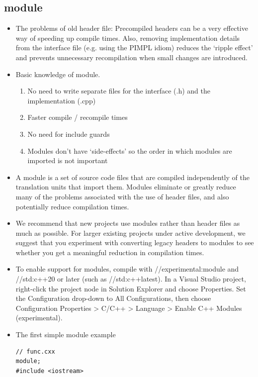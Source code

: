 \documentclass[a4paper,11pt,twoside]{book}
\begin{document}
\subsection{module}
\begin{itemize}
	
	\item The problems of old header file: Precompiled headers can be a very effective way of speeding up compile times. Also, removing implementation details from the interface file (e.g. using the PIMPL idiom) reduces the ‘ripple effect’ and prevents unnecessary recompilation when small changes are introduced.
	
	\item Basic knowledge of module.
	\begin{enumerate}
		\item No need to write separate files for the interface (.h) and the implementation (.cpp)
		\item Faster compile / recompile times
		\item No need for include guards	
		\item Modules don’t have ‘side-effects’ so the order in which modules are imported is not important
	\end{enumerate}

	
	\item A module is a set of source code files that are compiled independently of the translation units that import them. Modules eliminate or greatly reduce many of the problems associated with the use of header files, and also potentially reduce compilation times. 
	
	\item We recommend that new projects use modules rather than header files as much as possible. For larger existing projects under active development, we suggest that you experiment with converting legacy headers to modules to see whether you get a meaningful reduction in compilation times.
	
	\item To enable support for modules, compile with //experimental:module and //std:c++20 or later (such as //std:c++latest). In a Visual Studio project, right-click the project node in Solution Explorer and choose Properties. Set the Configuration drop-down to All Configurations, then choose Configuration Properties > C/C++ > Language > Enable C++ Modules (experimental).
    \item The first simple module example
\begin{lstlisting}
// func.cxx
module;
#include <iostream>


\end{lstlisting}
\end{itemize}
\end{document}

